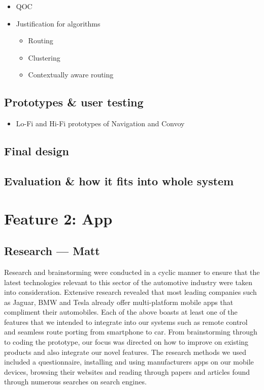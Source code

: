 \documentclass{article}
\begin{document}
\begin{itemize}
  \item QOC %
  \item Justification for algorithms
    \begin{itemize}
      \item Routing
      \item Clustering
      \item Contextually aware routing
    \end{itemize}
\end{itemize}

\subsection{Prototypes \& user testing}\label{ssec:nav-prototypes-testing}
\begin{itemize}
  \item Lo-Fi and Hi-Fi prototypes of Navigation and Convoy
\end{itemize}

\subsection{Final design}\label{ssec:nav-final-design}

\subsection{Evaluation \& how it fits into whole system}\label{ssec:nav-evaluation}


%
%
\section{Feature 2: App}\label{sec:app}

\subsection{Research --- Matt}\label{ssec:app-research}
Research and brainstorming were conducted in a cyclic manner to ensure that the latest technologies relevant to this sector of the automotive industry were taken into consideration. Extensive research revealed that most leading companies such as Jaguar, BMW and Tesla already offer multi-platform mobile apps that compliment their automobiles. Each of the above boasts at least one of the features that we intended to integrate into our systems such as remote control and seamless route porting from smartphone to car. From brainstorming through to coding the prototype, our focus was directed on how to improve on existing products and also integrate our novel features.
The research methods we used included a questionnaire, installing and using manufacturers apps on our mobile devices, browsing their websites and reading through papers and articles found through numerous searches on search engines. 
\end{document}
